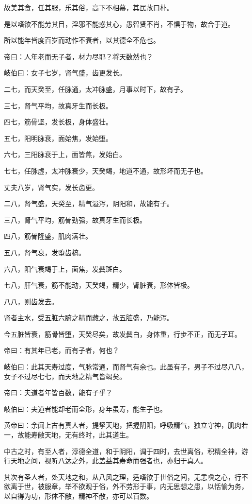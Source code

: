 \documentclass{article}%
\begin{document}
故美其食，任其服，乐其俗，高下不相慕，其民故曰朴。

是以嗜欲不能劳其目，淫邪不能惑其心，愚智贤不肖，不惧于物，故合于道。

所以能年皆度百岁而动作不衰者，以其德全不危也。

帝曰：人年老而无子者，材力尽耶？将天数然也？

岐伯曰：女子七岁，肾气盛，齿更发长。

二七，而天癸至，任脉通，太冲脉盛，月事以时下，故有子。

三七，肾气平均，故真牙生而长极。

四七，筋骨坚，发长极，身体盛壮。

五七，阳明脉衰，面始焦，发始堕。

六七，三阳脉衰于上，面皆焦，发始白。

七七，任脉虚，太冲脉衰少，天癸竭，地道不通，故形坏而无子也。

丈夫八岁，肾气实，发长齿更。

二八，肾气盛，天癸至，精气溢泻，阴阳和，故能有子。

三八，肾气平均，筋骨劲强，故真牙生而长极。

四八，筋骨隆盛，肌肉满壮。

五八，肾气衰，发堕齿槁。

六八，阳气衰竭于上，面焦，发鬓斑白。

七八，肝气衰，筋不能动，天癸竭，精少，肾脏衰，形体皆极。

八八，则齿发去。

肾者主水，受五脏六腑之精而藏之，故五脏盛，乃能泻。

今五脏皆衰，筋骨皆堕，天癸尽矣，故发鬓白，身体重，行步不正，而无子耳。

帝曰：有其年已老，而有子者，何也？

岐伯曰：此其天寿过度，气脉常通，而肾气有余也。此虽有子，男子不过尽八八，女子不过尽七七，而天地之精气皆竭矣。

帝曰：夫道者年皆百数，能有子乎？

岐伯曰：夫道者能却老而全形，身年虽寿，能生子也。

黄帝曰：余闻上古有真人者，提挈天地，把握阴阳，呼吸精气，独立守神，肌肉若一，故能寿敝天地，无有终时，此其道生。

中古之时，有至人者，淳德全道，和于阴阳，调于四时，去世离俗，积精全神，游行天地之间，视听八达之外，此盖益其寿命而强者也，亦归于真人。

其次有圣人者，处天地之和，从八风之理，适嗜欲于世俗之间，无恚嗔之心，行不欲离于世，被服章，举不欲观于俗，外不劳形于事，内无思想之患，以恬愉为务，以自得为功，形体不敝，精神不散，亦可以百数。
\end{document}
